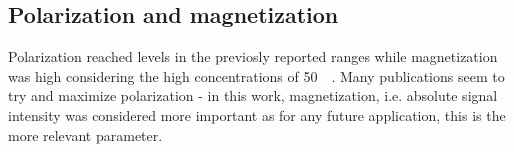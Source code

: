         \subsection{Polarization and magnetization}
            Polarization reached levels in the previosly reported ranges while magnetization was high considering the high concentrations of \SI{50}{\milli\molar}. Many publications seem to try and maximize polarization - in this work, magnetization, i.e. absolute signal intensity was considered more important as for any future application, this is the more relevant parameter.
